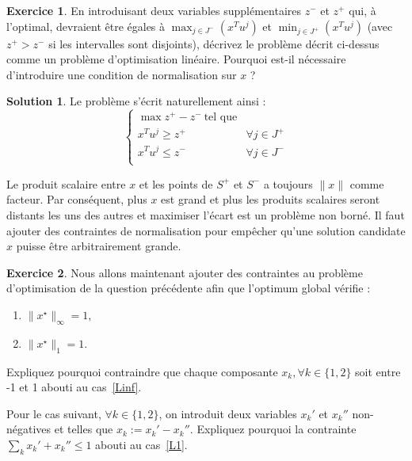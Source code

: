 \documentclass[a4paper,francais]{article}
\theoremstyle{definition}
\newtheorem{exercice}{Exercice}[section]
\newtheorem*{solution}{Solution}
\begin{document}
\begin{exercice}
  En introduisant deux variables supplémentaires
  $z^-$ et $z^+$ qui, à l'optimal, devraient être égales
  à $\max_{j \in J^-} (x^T u^j)$ et $\min_{j \in J^+} (x^T u^j)$
  (avec $z^+ > z^-$ si les intervalles sont disjoints),
  décrivez le problème décrit ci-dessus comme un problème d'optimisation linéaire.
  Pourquoi est-il nécessaire d'introduire une condition de normalisation sur $x$ ?
\end{exercice}

\begin{solution}
  Le problème s'écrit naturellement ainsi : 
  \[
  \left\{
  \begin{array}{ll}
    \max z^+ - z^- \ \text{tel que} & \\
    x^T u^j \geq z^+ & \forall j \in J^+ \\ 
    x^T u^j \leq z^- & \forall j \in J^- \\
  \end{array}
  \right.
  \]

  Le produit scalaire entre $x$ et les points de $S^+$ et $S^-$ a toujours $\|x\|$
  comme facteur. Par conséquent, plus $x$ est grand et plus les produits scalaires
  seront distants les uns des autres et maximiser l'écart est un problème non
  borné. Il faut ajouter des contraintes de normalisation pour empêcher qu'une
  solution candidate $x$ puisse être arbitrairement grande. 
\end{solution}

\begin{exercice}
  Nous allons maintenant ajouter des contraintes au problème d'optimisation
  de la question précédente afin que l'optimum global vérifie : 
  \begin{enumerate}
  \item\label{Linf} $\|x^\star\|_\infty = 1$,
  \item\label{L1} $\|x^\star\|_1 = 1$.
  \end{enumerate}
  
  Expliquez pourquoi contraindre que chaque composante $x_k, \forall k \in \{1, 2\}$
  soit entre -1 et 1 abouti au cas~\ref{Linf}.
  
  Pour le cas suivant, $\forall k \in \{1, 2\}$, on introduit deux variables $x_k'$ et
  $x_k''$ non-négatives et telles que $x_k := x_k' - x_k''$. Expliquez pourquoi la
  contrainte $\sum_k x_k' + x_k'' \leq 1$ abouti au cas~\ref{L1}. 
\end{exercice}
\end{document}
